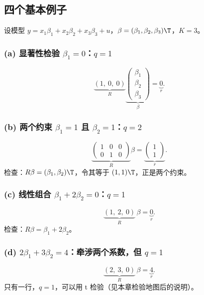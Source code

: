 \subsection{四个基本例子}

设模型 $y=x_1\beta_1+x_2\beta_2+x_3\beta_3+u$，$\beta=(\beta_1,\beta_2,\beta_3)\T$，$K=3$。

\subsubsection{(a) 显著性检验 \texorpdfstring{$\beta_1=0$}{beta1 = 0}：\texorpdfstring{$q=1$}{q = 1}}

\[
\underbrace{(1,\ 0,\ 0)}_{R}\underbrace{\begin{pmatrix}\beta_1\\\beta_2\\\beta_3\end{pmatrix}}_{\beta}=\underbrace{0}_{r}.
\]

\subsubsection{(b) 两个约束 \texorpdfstring{$\beta_1=1$}{beta1 = 1} 且 \texorpdfstring{$\beta_2=1$}{beta2 = 1}：\texorpdfstring{$q=2$}{q = 2}}

\[
\underbrace{\begin{pmatrix}1&0&0\\0&1&0\end{pmatrix}}_{R}\beta=\underbrace{\begin{pmatrix}1\\1\end{pmatrix}}_{r}.
\]
检查：$R\beta=(\beta_1,\beta_2)\T$，令其等于 $(1,1)\T$，正是两个约束。

\subsubsection{(c) 线性组合 \texorpdfstring{$\beta_1+2\beta_2=0$}{beta1 + 2 beta2 = 0}：\texorpdfstring{$q=1$}{q = 1}}

\[
\underbrace{(1,\ 2,\ 0)}_{R}\,\beta=\underbrace{0}_{r}.
\]
检查：$R\beta=\beta_1+2\beta_2$。

\subsubsection{(d) \texorpdfstring{$2\beta_1+3\beta_2=4$}{2 beta1 + 3 beta2 = 4}：牵涉两个系数，但 \texorpdfstring{$q=1$}{q = 1}}

\[
\underbrace{(2,\ 3,\ 0)}_{R}\,\beta=\underbrace{4}_{r}.
\]
只有一行，$q=1$，可以用 t 检验（见本章检验地图后的说明）。



